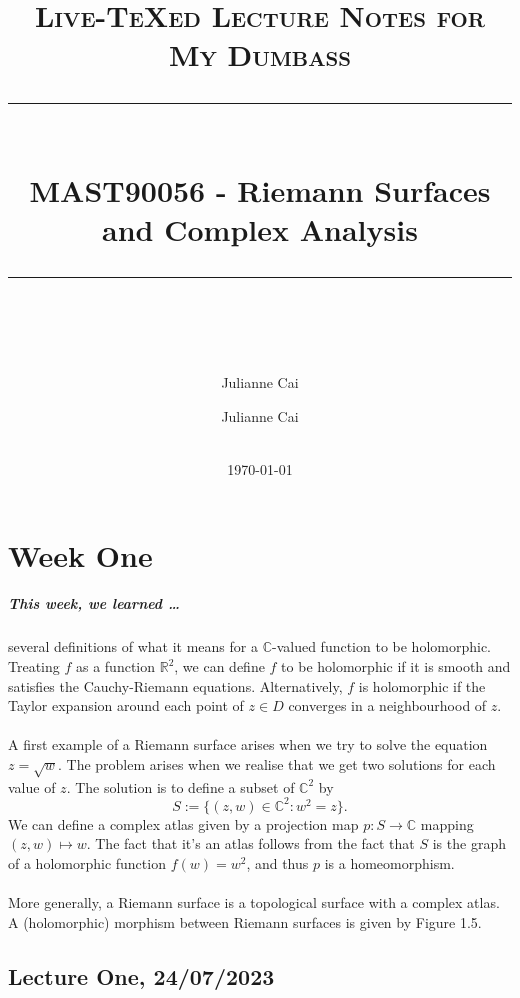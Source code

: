 \documentclass[a4paper]{report}
\author{
  Julianne Cai\\
}
\title{}
\date{\today}
\theoremstyle{definition}
\theoremstyle{remark}
\theoremstyle{proposition}
\theoremstyle{conjecture}
\theoremstyle{lemma}
\theoremstyle{corollary}
\theoremstyle{exercise}
\theoremstyle{example}
\newcommand{\C}{\mathbb{C}}
\newcommand{\HRule}[1]{\rule{\linewidth}{#1}}
\begin{document}
\title{ \normalsize \textsc{Live-TeXed Lecture Notes for My Dumbass}
		\\ [2.0cm]
		\HRule{0.5pt} \\
		\LARGE \textbf{MAST90056 - Riemann Surfaces and Complex Analysis}
		\HRule{2pt} \\ [0.5cm]
        }

\date{}
\author{
		Julianne Cai \\\\
        }
\maketitle
\newpage

\tableofcontents
\newpage

\chapter{Week One}

\paragraph{This week, we learned \ldots}
several definitions of what it means for a $\C$-valued function 
to be holomorphic. Treating $f$ as a function $\mathbb{R}^2$, we can define 
$f$ to be holomorphic if it is smooth and satisfies the Cauchy-Riemann equations.
Alternatively, $f$ is holomorphic if the Taylor expansion around each point 
of $z\in D$ converges in a neighbourhood of $z$.\\\\
A first example of a Riemann surface arises when we try to solve the equation
$z =\sqrt{w}$. The problem arises when we realise that we get two solutions
for each value of $z$. The solution is to define a subset of $\C^2$ by 
$$S := \lbrace (z,w)\in \C^2: w^2 = z\rbrace.$$
We can define a complex atlas given by a projection map 
$p : S \to \C$ mapping $(z,w)\mapsto w$. The fact that it's an atlas follows
from the fact that $S$ is the graph of a holomorphic function $f(w) = w^2$, 
and thus $p$ is a homeomorphism.\\\\
More generally, a Riemann surface is a topological surface with a complex atlas.
A (holomorphic) morphism between Riemann surfaces is given by Figure 1.5.

\section{Lecture One, 24/07/2023}
\end{document}
